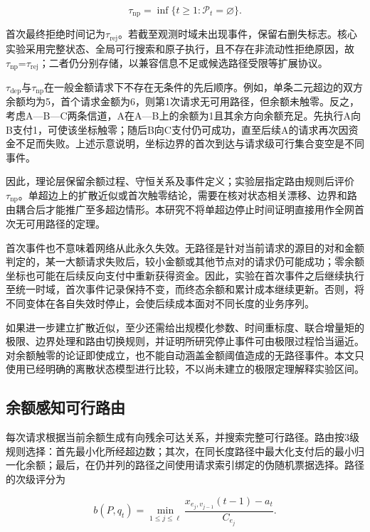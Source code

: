 \documentclass[UTF8,a4paper,twocolumn,fontset=none,zihao=5]{ctexart}
\begin{document}
\begin{equation}
\tau_{\mathrm{np}}=\inf\{t\geq1:\mathcal P_t=\varnothing\}.
\label{eq:5}\end{equation}


首次最终拒绝时间记为$\tau_{\mathrm{rej}}$。若截至观测时域未出现事件，保留右删失标志。核心实验采用完整状态、全局可行搜索和原子执行，且不存在非流动性拒绝原因，故$\tau_{\mathrm{np}}$=$\tau_{\mathrm{rej}}$；二者仍分别存储，以兼容信息不足或候选路径受限等扩展协议。


$\tau_{\mathrm{dep}}$与$\tau_{\mathrm{np}}$在一般金额请求下不存在无条件的先后顺序。例如，单条二元超边的双方余额均为5，首个请求金额为6，则第1次请求无可用路径，但余额未触零。反之，考虑A—B—C两条信道，A在A—B上的余额为1且其余方向余额充足。先执行A向B支付1，可使该坐标触零；随后B向C支付仍可成功，直至后续A的请求再次因资金不足而失败。上述示意说明，坐标边界的首次到达与请求级可行集合变空是不同事件。


因此，理论层保留余额过程、守恒关系及事件定义；实验层指定路由规则后评价$\tau_{\mathrm{np}}$。单超边上的扩散近似或首次触零结论，需要在核对状态相关漂移、边界和路由耦合后才能推广至多超边情形。本研究不将单超边停止时间证明直接用作全网首次无可用路径的定理。


首次事件也不意味着网络从此永久失效。无路径是针对当前请求的源目的对和金额判定的，某一大额请求失败后，较小金额或其他节点对的请求仍可能成功；零余额坐标也可能在后续反向支付中重新获得资金。因此，实验在首次事件之后继续执行至统一时域，首次事件记录保持不变，而终态余额和累计成本继续更新。否则，将不同变体在各自失效时停止，会使后续成本面对不同长度的业务序列。


如果进一步建立扩散近似，至少还需给出规模化参数、时间重标度、联合增量矩的极限、边界处理和路由切换规则，并证明所研究停止事件可由极限过程恰当逼近。对余额触零的论证即使成立，也不能自动涵盖金额阈值造成的无路径事件。本文只使用已经明确的离散状态模型进行比较，不以尚未建立的极限定理解释实验区间。


\subsection{余额感知可行路由}

每次请求根据当前余额生成有向残余可达关系，并搜索完整可行路径。路由按3级规则选择：首先最小化所经超边数；其次，在同长度路径中最大化支付后的最小归一化余额；最后，在仍并列的路径之间使用请求索引绑定的伪随机票据选择。路径的次级评分为



\begin{equation}
b(P,q_t)=\min_{1\leq j\leq\ell}\frac{x_{e_j,v_{j-1}}(t-1)-a_t}{C_{e_j}}.
\label{eq:6}\end{equation}
\end{document}
